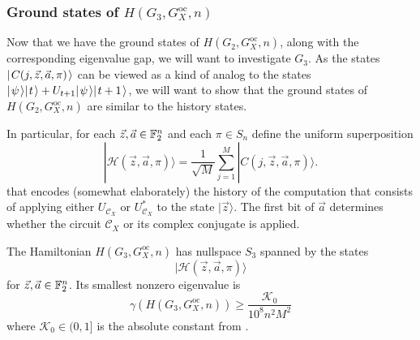 \documentclass[../thesis-main/thesis-main]{subfiles}
\begin{document}
\subsubsection{Ground states of $H(G_3,G_X^\text{oc},n)$}

Now that we have the ground states of $H(G_2,G_X^{\text{oc}},n)$, along with the corresponding eigenvalue gap, we will want to investigate $G_3$.  As the states $|\mspace{2mu} C(j,\vec{z},\vec{a},\pi) \mspace{2mu} \rangle$ can be viewed as a kind of analog to the states $|\mspace{2mu} \psi \mspace{2mu} \rangle|\mspace{2mu} t \mspace{2mu} \rangle + U_{t+1} |\mspace{2mu} \psi \mspace{2mu} \rangle|\mspace{2mu} t+1 \mspace{2mu} \rangle$, we will want to show that the ground states of $H(G_2,G_X^{\text{oc}},n)$ are similar to the history states.

In particular, for each $\vec{z},\vec{a}\in\mathbb{F}_2^{n}$ and each $\pi\in S_n$ define the uniform superposition
\begin{equation}
  |\mathcal{H}(\vec{z},\vec{a},\pi)\rangle
  =\frac{1}{\sqrt{M}}\sum_{j=1}^{M}|C\left(j,\vec{z},\vec{a},\pi\right)\rangle.
\end{equation}
that encodes (somewhat elaborately) the history of the computation that consists of applying either $U_{\mathcal{C}_X}$ or $U_{\mathcal{C}_X}^{*}$ to the state $|\vec{z}\rangle$. The first bit of $\vec{a}$ determines whether the circuit $\mathcal{C}_{X}$ or its complex conjugate is applied. 

\begin{lemma}
\label{lem:HG3}
The Hamiltonian $H(G_{3},G_X^{\text{oc}},n)$ has nullspace $S_3$ spanned by the states
\begin{equation}
  |\mathcal{H}(\vec{z},\vec{a},\pi)\rangle
\end{equation}
for $\vec{z},\vec{a}\in\mathbb{F}_2^{n}$. Its smallest nonzero eigenvalue is 
\begin{equation}
  \gamma(H(G_{3},G_X^{\text{oc}},n)) \geq \frac{\mathcal{K}_0}{10^8 n^{2}M^{2}}
\end{equation}
where $\mathcal{K}_0\in (0,1]$ is the absolute constant from .
\end{lemma}
\end{document}
